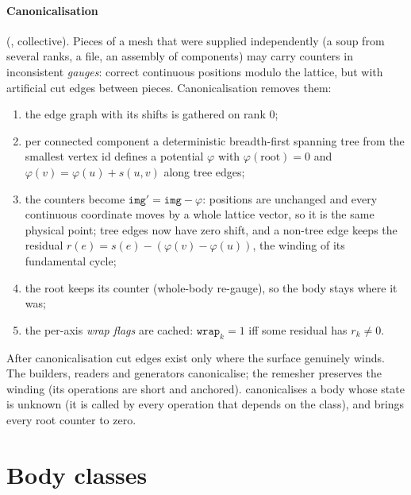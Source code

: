 \paragraph{Canonicalisation} (, collective). Pieces of a mesh that
were supplied independently (a soup from several ranks, a file, an assembly of components) may
carry counters in inconsistent \emph{gauges}: correct continuous positions modulo the lattice, but
with artificial cut edges between pieces. Canonicalisation removes them:
\begin{enumerate}
  \item the edge graph with its shifts is gathered on rank 0;
  \item per connected component a deterministic breadth-first spanning tree from the smallest
    vertex id defines a potential $\varphi$ with $\varphi(\text{root})=0$ and
    $\varphi(v)=\varphi(u)+s(u,v)$ along tree edges;
  \item the counters become $\texttt{img}'=\texttt{img}-\varphi$: positions are unchanged and every
    continuous coordinate moves by a whole lattice vector, so it is the same physical point;
    tree edges now have zero shift, and a non-tree edge keeps the residual
    $r(e)=s(e)-(\varphi(v)-\varphi(u))$, the winding of its fundamental cycle;
  \item the root keeps its counter (whole-body re-gauge), so the body stays where it was;
  \item the per-axis \emph{wrap flags} are cached: $\texttt{wrap}_k=1$ iff some residual has
    $r_k\neq0$.
\end{enumerate}
After canonicalisation cut edges exist only where the surface genuinely winds. The builders,
readers and generators canonicalise; the remesher preserves the winding (its operations are
short and anchored).  canonicalises a body whose state is unknown
(it is called by every operation that depends on the class), and 
brings every root counter to zero.

\section{Body classes}
\label{sec:classes}


